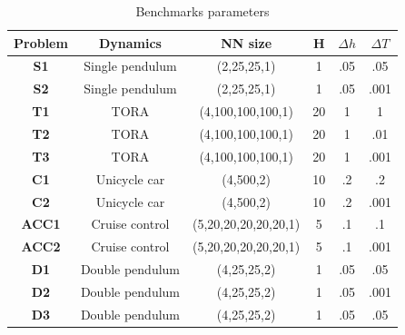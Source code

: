 \documentclass[journal]{IEEEtran}
\begin{document}
\begin{table}[h]
\centering
\begin{tabular}{cccccc}
\textbf{Problem} & \textbf{Dynamics} & \textbf{NN size}     & \textbf{H}   & $\Delta h$ &  $\Delta T$ \\ \hline
      \textbf{S1} & Single pendulum& (2,25,25,1) & 1 & .05 & .05   \\
      \textbf{S2} & Single pendulum& (2,25,25,1) & 1 & .05 & .001   \\
      \textbf{T1} & TORA & (4,100,100,100,1) & 20& 1& 1 \\ 
      \textbf{T2} & TORA & (4,100,100,100,1) & 20& 1& .01 \\ 
      \textbf{T3} & TORA & (4,100,100,100,1) & 20& 1& .001 \\ 
      \textbf{C1} & Unicycle car & (4,500,2) & 10& .2 & .2 \\
     \textbf{C2} & Unicycle car & (4,500,2) & 10& .2 & .001 \\
      \textbf{ACC1} & Cruise control & (5,20,20,20,20,20,1)& 5 & .1 & .1\\
      \textbf{ACC2} & Cruise control & (5,20,20,20,20,20,1)& 5 & .1 & .001\\
      \textbf{D1} & Double pendulum & (4,25,25,2) & 1 & .05 & .05\\
      \textbf{D2} & Double pendulum & (4,25,25,2) & 1 & .05 & .001\\
      \textbf{D3} & Double pendulum & (4,25,25,2) & 1 & .05 & .05\\
\end{tabular}
\caption{Benchmarks parameters}
\label{tab:param_benchmark}
\end{table}
\end{document}
